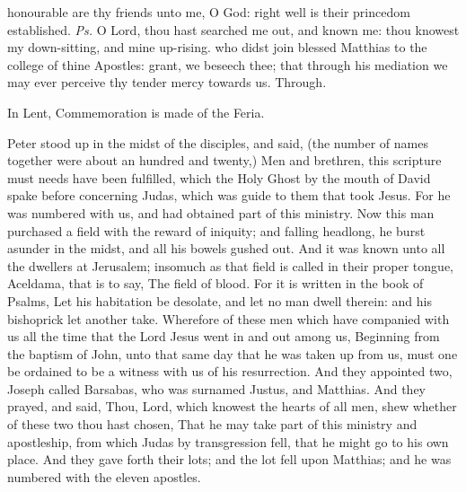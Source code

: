 \introit
{} honourable are thy friends unto me, O God: right well is their princedom established. \textit{Ps.} O Lord, thou hast searched me out, and known me: thou knowest my down-sitting, and mine up-rising.
\collect
 who didst join blessed Matthias to the college of thine Apostles: grant, we beseech thee; that through his mediation we may ever perceive thy tender mercy towards us. Through.
\begin{rubric}
    In Lent, Commemoration is made of the Feria.%
\end{rubric}
 Peter stood up in the midst of the disciples, and said, (the number of names together were about an hundred and twenty,) Men and brethren, this scripture must needs have been fulfilled, which the Holy Ghost by the mouth of David spake before concerning Judas, which was guide to them that took Jesus. For he was numbered with us, and had obtained part of this ministry. Now this man purchased a field with the reward of iniquity; and falling headlong, he burst asunder in the midst, and all his bowels gushed out. And it was known unto all the dwellers at Jerusalem; insomuch as that field is called in their proper tongue, Aceldama, that is to say, The field of blood. For it is written in the book of Psalms, Let his habitation be desolate, and let no man dwell therein: and his bishoprick let another take. Wherefore of these men which have companied with us all the time that the Lord Jesus went in and out among us, Beginning from the baptism of John, unto that same day that he was taken up from us, must one be ordained to be a witness with us of his resurrection. And they appointed two, Joseph called Barsabas, who was surnamed Justus, and Matthias. And they prayed, and said, Thou, Lord, which knowest the hearts of all men, shew whether of these two thou hast chosen, That he may take part of this ministry and apostleship, from which Judas by transgression fell, that he might go to his own place. And they gave forth their lots; and the lot fell upon Matthias; and he was numbered with the eleven apostles.


